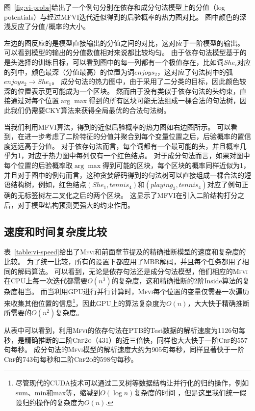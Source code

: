 图~\ref{fig:vi-probs}给出了一个例句分别在依存和成分句法模型上的分值（log potentials）与经过MFVI迭代近似得到的后验概率的热力图对比。
图中颜色的深浅反应了分值/概率的大小。

左边的图反应的是模型直接输出的分值之间的对比，这对应于一阶模型的输出。
可以看到模型的输出的分值数值相对来说都比较均匀。
由于依存句法模型基于的是头选择的训练目标，可以看到图中的每一列都有一个极值存在，比如词$She_i$对应的列中，颜色最深（分值最高）的位置为词$enjoys_2$，这对应了句法树中的弧$enjoys_2\rightarrow She_1$。
成分句法的热力图中，由于采用了二分类的目标，因此颜色较深的位置表示更可能成为一个区块。
然而由于没有类似于依存句法的头约束，直接通过对每个位置$\arg\max$得到的所有区块可能无法组成一棵合法的句法树，因此我们仍需要CKY算法来获得全局最优的合法句法树。

当我们利用MFVI算法，得到的近似后验概率的热力图如右边图所示。
可以看到，在进一步考虑了二阶特征的分值并聚合到每个变量位置之后，后验概率的置信度远远高于分值。
对于依存句法而言，每个词都有一个最可能的头，并且概率几乎为1，对应于热力图中每列仅有一个红色结点。
对于成分句法而言，如果对图中每个位置的后验概率取$\arg\max$得到可能的区块，每个区块的概率同样近似为1，并且对于图中的例句而言，这种贪婪解码得到的句法树可以直接组成一棵合法的短语结构树，例如，红色结点$(She_1,tennis_4)$和$(playing_3,tennis_4)$对应了例句正确的无标签树左二叉化之后的两个区块。
这显示了MFVI在引入二阶结构打分之后，对于模型结构预测更强大的约束作用。


\subsection{速度和时间复杂度比较}
\label{sub@sec:vi-speed}

表~\ref{table:vi-speed}给出了\textsc{Mfvi}和前面章节提及的精确推断模型的速度和复杂度的比较。
为了统一比较，所有的设置下都应用了MBR解码，并且每个任务都用了相同的解码算法。
可以看到，无论是依存句法还是成分句法模型，他们相应的\textsc{Mfvi}在CPU上每一次迭代都需要$O(n^3)$的复杂度，这和精确推断的2阶Inside算法的复杂度相当。
而当利用GPU进行并行计算时，\textsc{Mfvi}每个位置的变量仅需要一次遍历来收集其他位置的信息\footnote{尽管现代的CUDA技术可以通过二叉树等数据结构让并行化的归约操作，例如$\mathrm{sum}$、$\mathrm{min}$和$\mathrm{max}$等，缩减到$O(\log n)$复杂度的时间 \citep{wang-etal-2020-ain}，但是这里我们统一假设归约操作的复杂度为$O(n)$.}，因此GPU上的算法复杂度为$O(n)$，大大快于精确推断所需要的$O(n^2)$复杂度。

从表中可以看到，利用\textsc{Mfvi}的依存句法在PTB的Test数据的解析速度为1126句每秒，是精确推断的二阶\textsc{Crf2o}（431）的近三倍快，同样也大大快于一阶\textsc{Crf}的557句每秒。
成分句法的\textsc{Mfvi}模型的解析速度大约为905句每秒，同样显著快于一阶\textsc{Crf}的743句每秒和二阶\textsc{Crf2o}的598句每秒。

